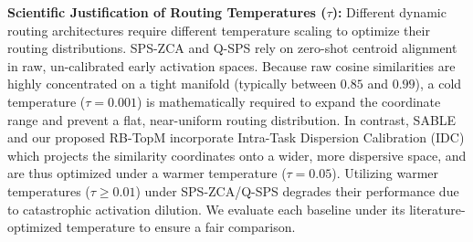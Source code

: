 \textbf{Scientific Justification of Routing Temperatures ($\tau$):} Different dynamic routing architectures require different temperature scaling to optimize their routing distributions. SPS-ZCA and Q-SPS rely on zero-shot centroid alignment in raw, un-calibrated early activation spaces. Because raw cosine similarities are highly concentrated on a tight manifold (typically between $0.85$ and $0.99$), a cold temperature ($\tau = 0.001$) is mathematically required to expand the coordinate range and prevent a flat, near-uniform routing distribution. In contrast, SABLE and our proposed RB-TopM incorporate Intra-Task Dispersion Calibration (IDC) which projects the similarity coordinates onto a wider, more dispersive space, and are thus optimized under a warmer temperature ($\tau = 0.05$). Utilizing warmer temperatures ($\tau \ge 0.01$) under SPS-ZCA/Q-SPS degrades their performance due to catastrophic activation dilution. We evaluate each baseline under its literature-optimized temperature to ensure a fair comparison.

